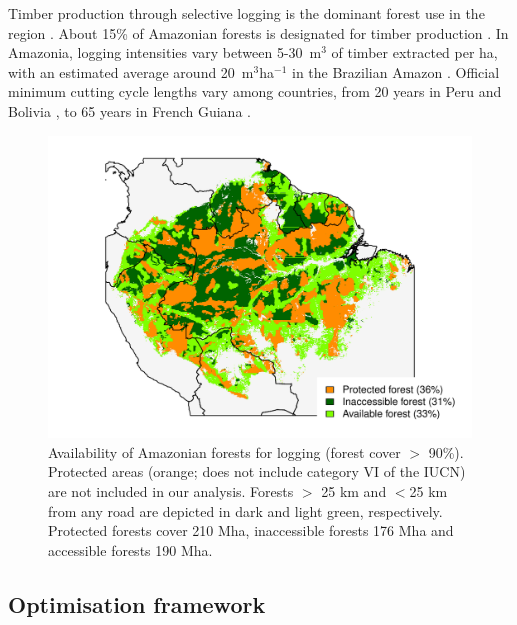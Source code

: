 \documentclass{article}
\begin{document}
Timber production through selective logging is the dominant forest use in the region \cite{Blaser2011}. About 15\% of Amazonian forests is designated for timber production \cite{FAO2011}. In Amazonia, logging intensities vary between 5-30~m$^3$ of timber extracted per ha, with an estimated average around 20~m$^3$ha$^{-1}$ in the Brazilian Amazon \cite{Asner2005}. Official minimum cutting cycle lengths vary among countries, from 20 years in Peru and Bolivia \cite{Fredericksen2003,Blaser2011}, to 65 years in French Guiana \cite{Gourlet-Fleury2004}. 

\begin{figure}
    \centering
    \includegraphics[width=\linewidth]{graphs/harv_areas.pdf}
    \caption{Availability of Amazonian forests for logging (forest cover $>$ 90\%). Protected areas (orange; does not include category VI of the IUCN) are not included in our analysis. Forests $>$ 25 km and $<$25 km from any road are depicted in dark and light green, respectively. Protected forests cover 210 Mha, inaccessible forests 176 Mha and accessible forests 190 Mha.}
    \label{fig:pharv}
\end{figure}

\subsection{Optimisation framework}
\end{document}
